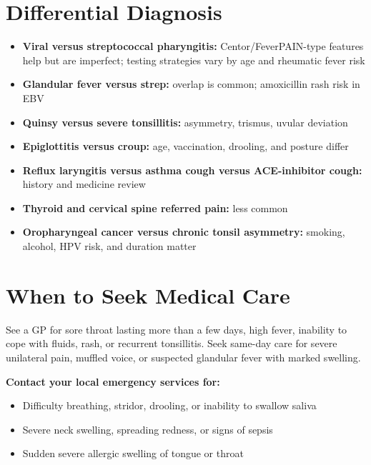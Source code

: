 \section*{Differential Diagnosis}
\begin{itemize}
    \item \textbf{Viral versus streptococcal pharyngitis:} Centor/FeverPAIN-type features help but are imperfect; testing strategies vary by age and rheumatic fever risk
    \item \textbf{Glandular fever versus strep:} overlap is common; amoxicillin rash risk in EBV
    \item \textbf{Quinsy versus severe tonsillitis:} asymmetry, trismus, uvular deviation
    \item \textbf{Epiglottitis versus croup:} age, vaccination, drooling, and posture differ
    \item \textbf{Reflux laryngitis versus asthma cough versus ACE-inhibitor cough:} history and medicine review
    \item \textbf{Thyroid and cervical spine referred pain:} less common
    \item \textbf{Oropharyngeal cancer versus chronic tonsil asymmetry:} smoking, alcohol, HPV risk, and duration matter
\end{itemize}

\section*{When to Seek Medical Care}
See a GP for sore throat lasting more than a few days, high fever, inability to cope with fluids, rash, or recurrent tonsillitis. Seek same-day care for severe unilateral pain, muffled voice, or suspected glandular fever with marked swelling.

\textbf{Contact your local emergency services for:}
\begin{itemize}
    \item Difficulty breathing, stridor, drooling, or inability to swallow saliva
    \item Severe neck swelling, spreading redness, or signs of sepsis
    \item Sudden severe allergic swelling of tongue or throat
\end{itemize}

